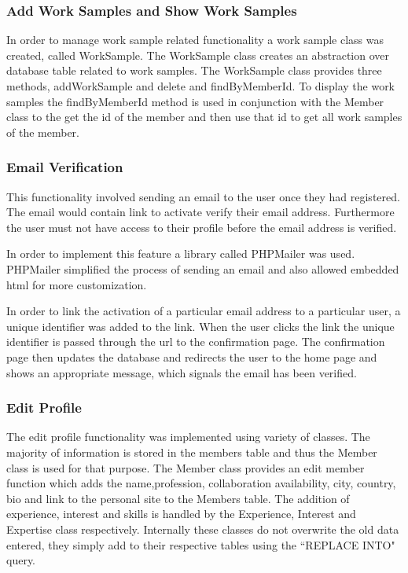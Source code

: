 \documentclass[a4paper,oneside,11pt]{report}
\begin{document}
\subsubsection{Add Work Samples and Show Work Samples}
In order to manage work sample related functionality a work sample class was created, called WorkSample. The WorkSample class creates an abstraction over database table related to work samples. The WorkSample class provides three methods, addWorkSample and delete and findByMemberId. To display the work samples the findByMemberId method is used in conjunction with the Member class to the get the id of the member and then use that id to get all work samples of the member.

\subsubsection{Email Verification}
This functionality involved sending an email to the user once they had registered. The email would contain link to activate verify their email address. Furthermore the user must not have access to their profile before the email address is verified.

In order to implement this feature a library called PHPMailer was used. PHPMailer simplified the process of sending an email and also allowed embedded html for more customization.

In order to link the activation of a particular email address to a particular user, a unique identifier was added to the link. When the user clicks the link the unique identifier is passed through the url to the confirmation page. The confirmation page then updates the database and redirects the user to the home page and shows an appropriate message, which signals the email has been verified.

\subsubsection{Edit Profile}
The edit profile functionality was implemented using variety of classes. The majority of information is stored in the members table and thus the Member class is used for that purpose. The Member class provides an edit member function which adds the name,profession, collaboration availability, city, country, bio and link to the personal site to the Members table. The addition of experience, interest and skills is handled by the Experience, Interest and Expertise class respectively. Internally these classes do not overwrite the old data entered, they simply add to their respective tables using the ``REPLACE INTO" query.
\end{document}
